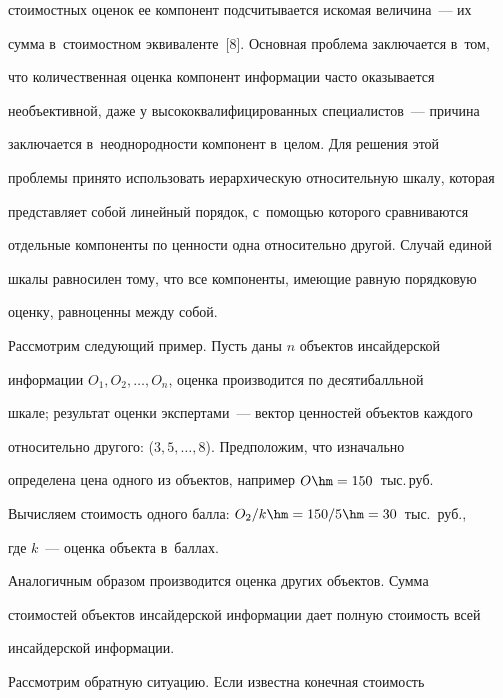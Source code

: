 стоимостных оценок ее компонент подсчитывается искомая величина~--- их 


сумма в~стоимостном эквиваленте~[8]. Основная проблема заключается в~том, 


что количественная оценка компонент информации часто оказывается 


необъективной, даже у высококвалифицированных специалистов~--- причина 


заключается в~неоднородности компонент в~целом. Для решения этой 


проблемы принято использовать иерархическую относительную шкалу, которая 


представляет собой линейный порядок, с~помощью которого сравниваются 


отдельные компоненты по ценности одна относительно другой. Случай единой 


шкалы равносилен тому, что все компоненты, имеющие равную порядковую 


оценку, равноценны между собой.


     


     Рассмотрим следующий пример. Пусть даны $n$ объектов инсайдерской 


информации $O_1, O_2, \ldots , O_n$, оценка производится по десятибалльной 


шкале; результат оценки экспертами~--- вектор ценностей объектов каждого 


относительно другого: ($3, 5, \ldots, 8$). Предположим, что изначально 


определена цена одного из объектов, например $O\hm=150$~тыс.\,руб.


     


     Вычисляем стоимость одного балла: $O_2/k\hm=150/5\hm=30$~тыс.\ руб., 


где $k$~--- оценка объекта в~баллах. 


     


     Аналогичным образом производится оценка других объектов. Сумма 


стоимостей объектов инсайдерской информации дает полную стоимость всей 


инсайдерской информации.


     


     Рассмотрим обратную ситуацию. Если известна конечная стоимость 


